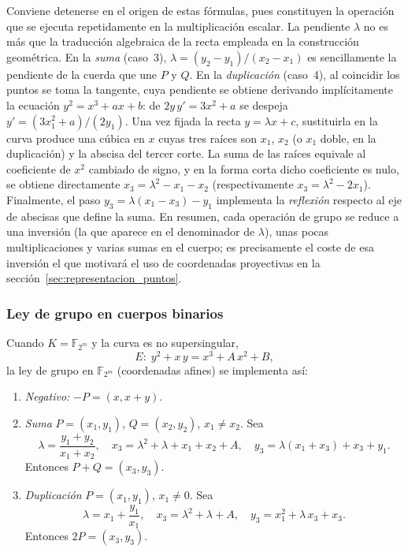 \noindent Conviene detenerse en el origen de estas fórmulas, pues constituyen la operación que se ejecuta repetidamente en la multiplicación escalar. 
La pendiente \(\lambda\) no es más que la traducción algebraica de la recta empleada en la construcción geométrica. 
En la \emph{suma} (caso~3), \(\lambda = (y_2-y_1)/(x_2-x_1)\) es sencillamente la pendiente de la cuerda que une \(P\) y \(Q\). 
En la \emph{duplicación} (caso~4), al coincidir los puntos se toma la tangente, cuya pendiente se obtiene derivando implícitamente la 
ecuación \(y^2 = x^3 + ax + b\): de \(2y\,y' = 3x^2 + a\) se despeja \(y' = (3x_1^2 + a)/(2y_1)\). Una vez fijada la recta \(y = \lambda x + c\), 
sustituirla en la curva produce una cúbica en \(x\) cuyas tres raíces son \(x_1\), \(x_2\) (o \(x_1\) doble, en la duplicación) y la abscisa del tercer corte. 
La suma de las raíces equivale al coeficiente de \(x^2\) cambiado de signo, y en la forma corta dicho coeficiente es nulo, 
se obtiene directamente \(x_3 = \lambda^2 - x_1 - x_2\) (respectivamente \(x_3 = \lambda^2 - 2x_1\)). 
Finalmente, el paso \(y_3 = \lambda(x_1 - x_3) - y_1\) implementa la \emph{reflexión} respecto al eje de abscisas que define la suma. 
En resumen, cada operación de grupo se reduce a una inversión (la que aparece en el denominador de \(\lambda\)), unas pocas multiplicaciones y varias sumas 
en el cuerpo; es precisamente el coste de esa inversión el que motivará el uso de coordenadas proyectivas en la sección~\ref{sec:representacion_puntos}.

\subsubsection*{Ley de grupo en cuerpos binarios}

Cuando \(K = \mathbb{F}_{2^m}\) y la curva es no supersingular,
\[
  E\colon\;y^2 + x\,y = x^3 + A\,x^2 + B,
\]
la ley de grupo en \(\mathbb{F}_{2^m}\) (coordenadas afines) se implementa así:

\begin{enumerate}
  \item \emph{Negativo:} \(-P = (x,x+y)\).
  \item \emph{Suma} \(P=(x_1,y_1)\), \(Q=(x_2,y_2)\), \(x_1\neq x_2\). Sea
    \[
      \lambda = \frac{y_1 + y_2}{x_1 + x_2},\quad
      x_3 = \lambda^2 + \lambda + x_1 + x_2 + A,\quad
      y_3 = \lambda(x_1 + x_3) + x_3 + y_1.
    \]
    Entonces \(P + Q = (x_3,y_3)\).
  \item \emph{Duplicación} \(P=(x_1,y_1)\), \(x_1\neq0\). Sea
    \[
      \lambda = x_1 + \frac{y_1}{x_1},\quad
      x_3 = \lambda^2 + \lambda + A,\quad
      y_3 = x_1^2 + \lambda\,x_3 + x_3.
    \]
    Entonces \(2P = (x_3,y_3)\).
\end{enumerate}

